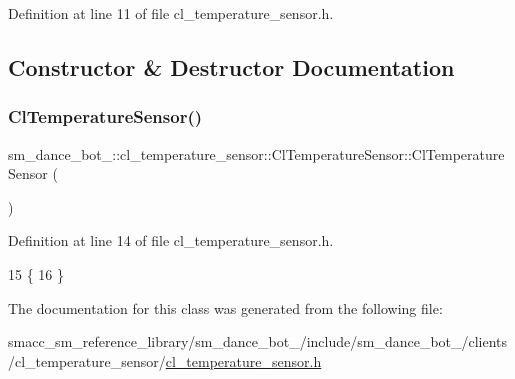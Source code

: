 Definition at line 11 of file cl\+\_\+temperature\+\_\+sensor.\+h.



\subsection{Constructor \& Destructor Documentation}
\mbox{\label{classsm__dance__bot__2_1_1cl__temperature__sensor_1_1ClTemperatureSensor_ac7c33050a8330c985eaf7a7539d9ea55}} 
\subsubsection{\texorpdfstring{Cl\+Temperature\+Sensor()}{ClTemperatureSensor()}}
{\footnotesize\ttfamily sm\+\_\+dance\+\_\+bot\+\_\+::cl\+\_\+temperature\+\_\+sensor\+::\+Cl\+Temperature\+Sensor\+::\+Cl\+Temperature\+Sensor (\begin{DoxyParamCaption}{ }\end{DoxyParamCaption})\hspace{0.3cm}{\ttfamily [inline]}}



Definition at line 14 of file cl\+\_\+temperature\+\_\+sensor.\+h.


\begin{DoxyCode}
15     \{
16     \}
\end{DoxyCode}


The documentation for this class was generated from the following file\+:\begin{DoxyCompactItemize}
\item 
smacc\+\_\+sm\+\_\+reference\+\_\+library/sm\+\_\+dance\+\_\+bot\+\_/include/sm\+\_\+dance\+\_\+bot\+\_/clients/cl\+\_\+temperature\+\_\+sensor/\hyperlink{2_2include_2sm__dance__bot__2_2clients_2cl__temperature__sensor_2cl__temperature__sensor_8h}{cl\+\_\+temperature\+\_\+sensor.\+h}\end{DoxyCompactItemize}
